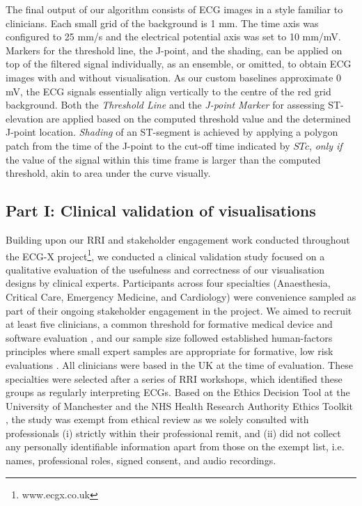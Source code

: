 \documentclass[
  10pt,
  letterpaper,
]{article}
\begin{document}
The final output of our algorithm consists of ECG images in a style
familiar to clinicians. Each small grid of the background is 1 mm. The
time axis was configured to 25 mm/s and the electrical potential axis
was set to 10 mm/mV. Markers for the threshold line, the J-point, and
the shading, can be applied on top of the filtered signal individually,
as an ensemble, or omitted, to obtain ECG images with and without
visualisation. As our custom baselines approximate 0 mV, the ECG signals
essentially align vertically to the centre of the red grid background.
Both the \textit{Threshold Line} and the \textit{J-point Marker} for
assessing ST-elevation are applied based on the computed threshold value
and the determined J-point location. \textit{Shading} of an ST-segment
is achieved by applying a polygon patch from the time of the J-point to
the cut-off time indicated by \(STc\), \textit{only if} the value of the
signal within this time frame is larger than the computed threshold,
akin to area under the curve visually.

\subsection{Part I: Clinical validation of
visualisations}\label{part-i-clinical-validation-of-visualisations}

Building upon our RRI and stakeholder engagement work conducted
throughout the ECG-X project\footnote{www.ecgx.co.uk}, we conducted a
clinical validation study focused on a qualitative evaluation of the
usefulness and correctness of our visualisation designs by clinical
experts. Participants across four specialties (Anaesthesia, Critical
Care, Emergency Medicine, and Cardiology) were convenience sampled
\cite{mason_qualitative_2018} as part of their ongoing stakeholder
engagement in the project. We aimed to recruit at least five clinicians,
a common threshold for formative medical device and software evaluation
\citep{FDA2016HumanFactors}, and our sample size followed established
human-factors principles where small expert samples are appropriate for
formative, low risk evaluations \citep{IEC}. All clinicians were based
in the UK at the time of evaluation. These specialties were selected
after a series of RRI workshops, which identified these groups as
regularly interpreting ECGs. Based on the Ethics Decision Tool at the
University of Manchester and the NHS Health Research Authority Ethics
Toolkit \cite{nhs_ethics}, the study was exempt from ethical review as
we solely consulted with professionals (i) strictly within their
professional remit, and (ii) did not collect any personally identifiable
information apart from those on the exempt list, i.e. names,
professional roles, signed consent, and audio recordings.
\end{document}
